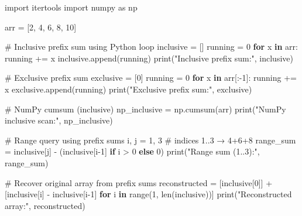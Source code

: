 \documentclass[
  letterpaper,
  DIV=11,
  numbers=noendperiod]{scrreprt}
\newenvironment{Shaded}{\begin{snugshade}}{\end{snugshade}}
\newcommand{\BuiltInTok}[1]{\textcolor[rgb]{0.00,0.23,0.31}{#1}}
\newcommand{\CommentTok}[1]{\textcolor[rgb]{0.37,0.37,0.37}{#1}}
\newcommand{\ControlFlowTok}[1]{\textcolor[rgb]{0.00,0.23,0.31}{\textbf{#1}}}
\newcommand{\DecValTok}[1]{\textcolor[rgb]{0.68,0.00,0.00}{#1}}
\newcommand{\ImportTok}[1]{\textcolor[rgb]{0.00,0.46,0.62}{#1}}
\newcommand{\KeywordTok}[1]{\textcolor[rgb]{0.00,0.23,0.31}{\textbf{#1}}}
\newcommand{\NormalTok}[1]{\textcolor[rgb]{0.00,0.23,0.31}{#1}}
\newcommand{\OperatorTok}[1]{\textcolor[rgb]{0.37,0.37,0.37}{#1}}
\newcommand{\StringTok}[1]{\textcolor[rgb]{0.13,0.47,0.30}{#1}}
\begin{document}
\begin{Shaded}
\begin{Highlighting}[]
\ImportTok{import}\NormalTok{ itertools}
\ImportTok{import}\NormalTok{ numpy }\ImportTok{as}\NormalTok{ np}

\NormalTok{arr }\OperatorTok{=}\NormalTok{ [}\DecValTok{2}\NormalTok{, }\DecValTok{4}\NormalTok{, }\DecValTok{6}\NormalTok{, }\DecValTok{8}\NormalTok{, }\DecValTok{10}\NormalTok{]}

\CommentTok{\# Inclusive prefix sum using Python loop}
\NormalTok{inclusive }\OperatorTok{=}\NormalTok{ []}
\NormalTok{running }\OperatorTok{=} \DecValTok{0}
\ControlFlowTok{for}\NormalTok{ x }\KeywordTok{in}\NormalTok{ arr:}
\NormalTok{    running }\OperatorTok{+=}\NormalTok{ x}
\NormalTok{    inclusive.append(running)}
\BuiltInTok{print}\NormalTok{(}\StringTok{"Inclusive prefix sum:"}\NormalTok{, inclusive)}

\CommentTok{\# Exclusive prefix sum}
\NormalTok{exclusive }\OperatorTok{=}\NormalTok{ [}\DecValTok{0}\NormalTok{]}
\NormalTok{running }\OperatorTok{=} \DecValTok{0}
\ControlFlowTok{for}\NormalTok{ x }\KeywordTok{in}\NormalTok{ arr[:}\OperatorTok{{-}}\DecValTok{1}\NormalTok{]:}
\NormalTok{    running }\OperatorTok{+=}\NormalTok{ x}
\NormalTok{    exclusive.append(running)}
\BuiltInTok{print}\NormalTok{(}\StringTok{"Exclusive prefix sum:"}\NormalTok{, exclusive)}

\CommentTok{\# NumPy cumsum (inclusive)}
\NormalTok{np\_inclusive }\OperatorTok{=}\NormalTok{ np.cumsum(arr)}
\BuiltInTok{print}\NormalTok{(}\StringTok{"NumPy inclusive scan:"}\NormalTok{, np\_inclusive)}

\CommentTok{\# Range query using prefix sums}
\NormalTok{i, j }\OperatorTok{=} \DecValTok{1}\NormalTok{, }\DecValTok{3}  \CommentTok{\# indices 1..3 → 4+6+8}
\NormalTok{range\_sum }\OperatorTok{=}\NormalTok{ inclusive[j] }\OperatorTok{{-}}\NormalTok{ (inclusive[i}\OperatorTok{{-}}\DecValTok{1}\NormalTok{] }\ControlFlowTok{if}\NormalTok{ i }\OperatorTok{\textgreater{}} \DecValTok{0} \ControlFlowTok{else} \DecValTok{0}\NormalTok{)}
\BuiltInTok{print}\NormalTok{(}\StringTok{"Range sum (1..3):"}\NormalTok{, range\_sum)}

\CommentTok{\# Recover original array from prefix sums}
\NormalTok{reconstructed }\OperatorTok{=}\NormalTok{ [inclusive[}\DecValTok{0}\NormalTok{]] }\OperatorTok{+}\NormalTok{ [inclusive[i] }\OperatorTok{{-}}\NormalTok{ inclusive[i}\OperatorTok{{-}}\DecValTok{1}\NormalTok{] }\ControlFlowTok{for}\NormalTok{ i }\KeywordTok{in} \BuiltInTok{range}\NormalTok{(}\DecValTok{1}\NormalTok{, }\BuiltInTok{len}\NormalTok{(inclusive))]}
\BuiltInTok{print}\NormalTok{(}\StringTok{"Reconstructed array:"}\NormalTok{, reconstructed)}
\end{Highlighting}
\end{Shaded}
\end{document}

